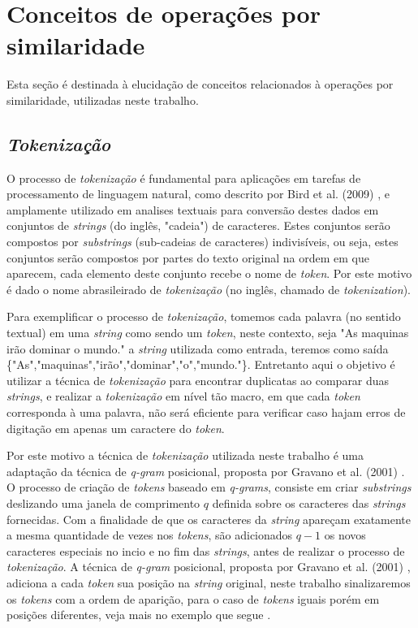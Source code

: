 \section{Conceitos de operações por similaridade}

Esta seção é destinada à elucidação de conceitos relacionados à operações por similaridade, utilizadas neste trabalho.

\subsection{\textit{Tokenização}}

O processo de \textit{tokenização} é fundamental para aplicações em tarefas de processamento de linguagem natural, como descrito por Bird et al. (2009) \cite{Bird:2009:NLP}, e amplamente utilizado em analises textuais para conversão destes dados em conjuntos de \textit{strings} (do inglês, "cadeia") de caracteres. Estes conjuntos serão compostos por \textit{substrings} (sub-cadeias de caracteres) indivisíveis, ou seja, estes conjuntos serão compostos por partes do texto original na ordem em que aparecem, cada elemento deste conjunto recebe o nome de \textit{token}.  Por este motivo é dado o nome abrasileirado de \textit{tokenização} (no inglês, chamado de \textit{tokenization}).

Para exemplificar o processo de \textit{tokenização}, tomemos cada palavra (no sentido textual) em uma \textit{string} como sendo um \textit{token}, neste contexto, seja "As maquinas irão dominar o mundo." a \textit{string} utilizada como entrada, teremos como saída \{"As","maquinas","irão","dominar","o","mundo."\}. Entretanto aqui o objetivo é utilizar a técnica de \textit{tokenização} para encontrar duplicatas ao comparar duas \textit{strings}, e realizar a \textit{tokenização} em nível tão macro, em que cada \textit{token} corresponda à uma palavra, não será eficiente para verificar caso hajam erros de digitação em apenas um caractere do \textit{token}.

Por este motivo a técnica de \textit{tokenização} utilizada neste trabalho é uma adaptação da técnica de \textit{q-gram} posicional, proposta por Gravano et al. (2001) \cite{Gravano:2001:ASJ:645927.672200}. O processo de criação de \textit{tokens} baseado em \textit{q-grams}, consiste em criar \textit{substrings} deslizando uma janela de comprimento $q$ definida sobre os caracteres das \textit{strings} fornecidas. Com a finalidade de que os caracteres da \textit{string} apareçam exatamente a mesma quantidade de vezes nos \textit{tokens}, são adicionados $q-1$ os novos caracteres  especiais no incio e no fim das \textit{strings}, antes de realizar o processo de \textit{tokenização}. A técnica de \textit{q-gram} posicional, proposta por Gravano et al. (2001) \cite{Gravano:2001:ASJ:645927.672200}, adiciona a cada \textit{token} sua posição na \textit{string} original, neste trabalho sinalizaremos os \textit{tokens} com a ordem de aparição, para o caso de \textit{tokens} iguais porém em posições diferentes, veja mais no exemplo que segue .

